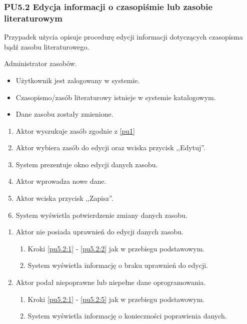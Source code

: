 \subsubsection{PU5.2 Edycja informacji o czasopiśmie lub zasobie literaturowym}

Przypadek użycia opisuje procedurę edycji informacji dotyczących czasopisma bądź zasobu literaturowego.

Administrator zasobów.

\begin{itemize}
\item Użytkownik jest zalogowany w systemie.
\item Czasopismo/zasób literaturowy istnieje w systemie katalogowym.
\end{itemize}

\begin{itemize}
\item Dane zasobu zostały zmienione.
\end{itemize}

\begin{enumerate}
\item \label{pu5.2:1} Aktor wyszukuje zasób zgodnie z \ref{pu1}
\item \label{pu5.2:2} Aktor wybiera zasób do edycji oraz wciska przycisk ,,Edytuj''.
\item System prezentuje okno edycji danych zasobu.
\item Aktor wprowadza nowe dane.
\item \label{pu5.2:5} Aktor wciska przycisk ,,Zapisz''.
\item System wyświetla potwierdzenie zmiany danych zasobu.
\end{enumerate}

\begin{enumerate}
\item Aktor nie posiada uprawnień do edycji danych zasobu.
	\begin{enumerate}[label*=\arabic*.]
		\item Kroki \ref{pu5.2:1} - \ref{pu5.2:2} jak w przebiegu podstawowym.
		\item System wyświetla informację o braku uprawnień do edycji.
	\end{enumerate}
\item Aktor podał niepoprawne lub niepełne dane oprogramowania.
	\begin{enumerate}[label*=\arabic*.]
		\item Kroki \ref{pu5.2:1} - \ref{pu5.2:5} jak w przebiegu podstawowym.
		\item System wyświetla informację o konieczności poprawienia danych.
	\end{enumerate}
\end{enumerate}


